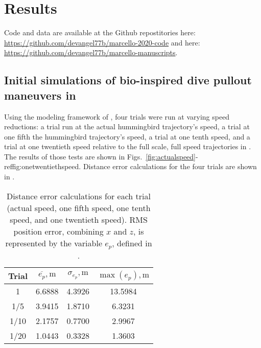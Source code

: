 \section{Results}
\label{sec:results}

Code and data are available at the Github repostitories here: \url{https://github.com/devangel77b/marcello-2020-code} and here: \url{https://github.com/devangel77b/marcello-manuscripts}. 

\subsection{Initial simulations of bio-inspired dive pullout maneuvers in \Matlab}
Using the modeling framework of \cite{hartman2014quadcopter}, four trials were run at varying speed reductions: a trial run at the actual hummingbird trajectory's speed, a trial at one fifth the hummingbird trajectory's speed, a trial at one tenth speed, and a trial at one twentieth speed relative to the full scale, full speed trajectories in \cite{clark2009courtship}. The results of those tests are shown in Figs.~\ref{fig:actualspeed}-ref{fig:onetwentiethspeed}. Distance error calculations for the four trials are shown in . 
\begin{table}[hb]
\caption{Distance error calculations for each trial (actual speed, one fifth speed, one tenth speed, and one twentieth speed). RMS position error, combining $x$ and $z$, is represented by the variable $e_p$, defined in .}
\label{tab:RMSE}
\begin{center}
\begin{tabular}{cccc}
\toprule
Trial & $\overline{e_p}, \si{\meter}$ & $\sigma_{e_p}, \si{\meter}$ & $\max(e_p), \si{\meter}$  \\ %
\midrule
1 & 6.6888 & 4.3926 & 13.5984 \\
1/5 & 3.9415 & 1.8710 & 6.3231 \\
1/10 & 2.1757 & 0.7700 & 2.9967 \\
1/20 & 1.0443 & 0.3328 & 1.3603 \\
\bottomrule
\end{tabular}
\end{center}
\end{table}

